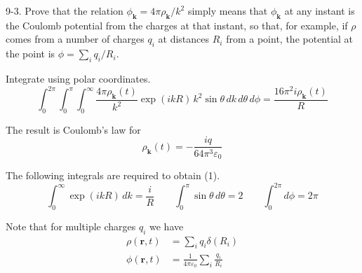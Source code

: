 \documentclass[12pt]{article}
\begin{document}
9-3.
Prove that the relation $\phi_{\mathbf k}=4\pi\rho_{\mathbf k}/k^2$
simply means that $\phi_{\mathbf k}$ at any instant is the Coulomb
potential from the charges at that instant, so that, for example,
if $\rho$ comes from a number of charges $q_i$ at distances $R_i$
from a point, the potential at the point is
$\phi=\sum_iq_i/R_i$.

\bigskip
Integrate using polar coordinates.
\begin{equation*}
\int_0^{2\pi}\int_0^\pi\int_0^\infty
\frac{4\pi\rho_{\mathbf k}(t)}{k^2}\exp(ikR)\,k^2\sin\theta\,dk\,d\theta\,d\phi
=\frac{16\pi^2i\rho_{\mathbf k}(t)}{R}
\tag{1}
\end{equation*}

The result is Coulomb's law for
\begin{equation*}
\rho_{\mathbf k}(t)=-\frac{iq}{64\pi^3\varepsilon_0}
\end{equation*}

The following integrals are required to obtain (1).
\begin{equation*}
\int_0^\infty\exp(ikR)\,dk=\frac{i}{R}
\qquad
\int_0^\pi\sin\theta\,d\theta=2
\qquad
\int_0^{2\pi}d\phi=2\pi
\end{equation*}

Note that for multiple charges $q_i$ we have
\begin{align*}
\rho(\mathbf r,t)&=\sum_iq_i\delta(R_i)
\\
\phi(\mathbf r,t)&=\frac{1}{4\pi\varepsilon_0}\sum_i\frac{q_i}{R_i}
\end{align*}
\end{document}
